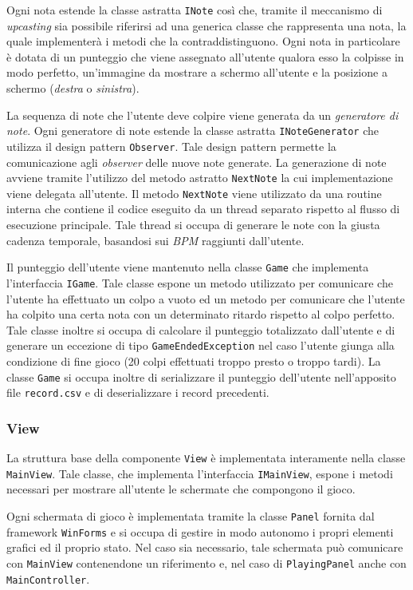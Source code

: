 Ogni nota estende la classe astratta \texttt{INote} così che, tramite il meccanismo di \emph{upcasting} sia possibile riferirsi ad una generica classe che rappresenta una nota, la quale implementerà i metodi che la contraddistinguono.
Ogni nota in particolare è dotata di un punteggio che viene assegnato all'utente qualora esso la colpisse in modo perfetto, un'immagine da mostrare a schermo all'utente e la posizione a schermo (\emph{destra} o \emph{sinistra}).

La sequenza di note che l'utente deve colpire viene generata da un \emph{generatore di note}. Ogni generatore di note estende la classe astratta \texttt{INoteGenerator} che utilizza il design pattern \texttt{Observer}. Tale design pattern permette la comunicazione agli \emph{observer} delle nuove note generate.
La generazione di note avviene tramite l'utilizzo del metodo astratto \texttt{NextNote} la cui implementazione viene delegata all'utente.
Il metodo \texttt{NextNote} viene utilizzato da una routine interna che contiene il codice eseguito da un thread separato rispetto al flusso di esecuzione principale.
Tale thread si occupa di generare le note con la giusta cadenza temporale, basandosi sui \emph{BPM} raggiunti dall'utente.

Il punteggio dell'utente viene mantenuto nella classe \texttt{Game} che implementa l'interfaccia \texttt{IGame}. Tale classe espone un metodo utilizzato per comunicare che l'utente ha effettuato un colpo a vuoto ed un metodo per comunicare che l'utente ha colpito una certa nota con un determinato ritardo rispetto al colpo perfetto.
Tale classe inoltre si occupa di calcolare il punteggio totalizzato dall'utente e di generare un eccezione di tipo \texttt{GameEndedException} nel caso l'utente giunga alla condizione di fine gioco (20 colpi effettuati troppo presto o troppo tardi).
La classe \texttt{Game} si occupa inoltre di serializzare il punteggio dell'utente nell'apposito file \texttt{record.csv} e di deserializzare i record precedenti.

\subsubsection{View}
La struttura base della componente \texttt{View} è implementata interamente nella classe \texttt{MainView}. Tale classe, che implementa l'interfaccia \texttt{IMainView}, espone i metodi necessari per mostrare all'utente le schermate che compongono il gioco.

Ogni schermata di gioco è implementata tramite la classe \texttt{Panel} fornita dal framework \texttt{WinForms} e si occupa di gestire in modo autonomo i propri elementi grafici ed il proprio stato.
Nel caso sia necessario, tale schermata può comunicare con \texttt{MainView} contenendone un riferimento e, nel caso di \texttt{PlayingPanel} anche con \texttt{MainController}.

